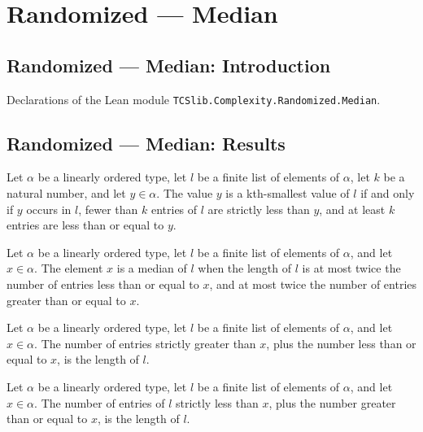 \section{Randomized --- Median}
\subsection*{Randomized --- Median: Introduction}

Declarations of the Lean module \texttt{TCSlib.Complexity.Randomized.Median}.

\subsection*{Randomized --- Median: Results}

\begin{definition}
\label{Randomized.IsKthSmallest}
\leanok
Let $\alpha$ be a linearly ordered type, let $l$ be a finite list of elements of
$\alpha$, let $k$ be a natural number, and let $y\in\alpha$. The value $y$ is a
kth-smallest value of $l$ if and only if $y$ occurs in $l$, fewer than $k$ entries of
$l$ are strictly less than $y$, and at least $k$ entries are less than or equal to $y$.
\end{definition}

\begin{definition}
\label{Randomized.IsMedian}
\leanok
Let $\alpha$ be a linearly ordered type, let $l$ be a finite list of elements of
$\alpha$, and let $x\in\alpha$. The element $x$ is a median of $l$ when the length of
$l$ is at most twice the number of entries less than or equal to $x$, and at most twice
the number of entries greater than or equal to $x$.
\end{definition}

\begin{lemma}
\label{Randomized.countP_lt_add_countP_le}
\leanok
{}
Let $\alpha$ be a linearly ordered type, let $l$ be a finite list of elements of
$\alpha$, and let $x\in\alpha$. The number of entries strictly greater than $x$, plus
the number less than or equal to $x$, is the length of $l$.
\end{lemma}

\begin{lemma}
\label{Randomized.countP_lt_add_countP_ge}
\leanok
{}
Let $\alpha$ be a linearly ordered type, let $l$ be a finite list of elements of
$\alpha$, and let $x\in\alpha$. The number of entries of $l$ strictly less than $x$,
plus the number greater than or equal to $x$, is the length of $l$.
\end{lemma}

